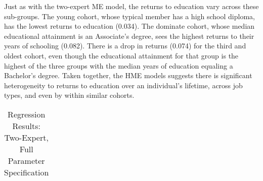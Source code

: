 \documentclass[12pt]{article}
\theoremstyle{definition}
\begin{document}
Just as with the two-expert ME model, the returns to education vary across these sub-groups. The young cohort, whose typical member has a high school diploma, has the lowest returns to education (0.034). The dominate cohort, whose median educational attainment is an Associate's degree, sees the highest returns to their years of schooling (0.082). There is a drop in returns (0.074) for the third and oldest cohort, even though the educational attainment for that group is the highest of the three groups with the median years of education equaling a Bachelor's degree. Taken together, the HME models suggests there is significant heterogeneity to returns to education over an individual's lifetime, across job types, and even by within similar cohorts.


\begin{landscape}
  \begin{table} \centering
    \caption{Regression Results: Two-Expert, Full Parameter Specification}
      \begin{threeparttable}
        \tabcolsep=0.11cm
        \begin{tabular}[l]{l r l l r l l c r l c r l l r l l r l l}
  

\end{tabular}
\end{threeparttable}
\end{table}
\end{landscape}
\end{document}
